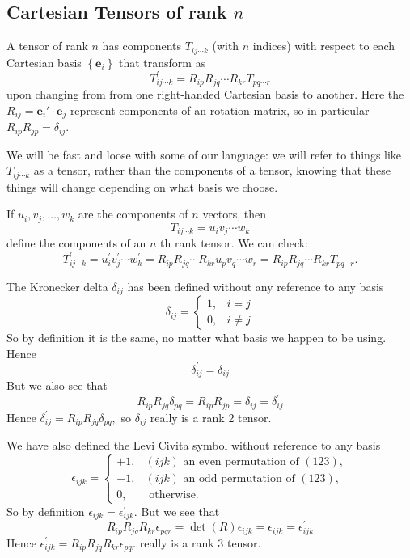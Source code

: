 \subsection{Cartesian Tensors of rank $ n $}
\begin{definition}
    A tensor of rank $n$ has components $T_{i j \cdots k}$ (with $n$ indices) with respect to each Cartesian basis $\left\{\mathbf{e}_{i}\right\}$ that transform as
    \[
        T_{i j \cdots k}^{\prime}=R_{i p} R_{j q} \cdots R_{k r} T_{p q \cdots r}
    \]
    upon changing from from one right-handed Cartesian basis to another. Here the $R_{i j}=\mathbf{e}_i' \cdot \mathbf{e}_j$ represent components of an rotation matrix, so in particular $R_{i p} R_{j p}=\delta_{i j}$.
\end{definition}

We will be fast and loose with some of our language: we will refer to things like $T_{i j \cdots k}$ as a tensor, rather than the components of a tensor, knowing that these things will change depending on what basis we choose.
\begin{example}
    If $u_{i}, v_{j}, \dots, w_{k}$ are the components of $n$ vectors, then
    \[
    T_{i j \cdots k}=u_{i} v_{j} \cdots w_{k}
    \]
    define the components of an $n$ th rank tensor. We can check:
    \[
    T_{i j \cdots k}^{\prime}=u_{i}^{\prime} v_{j}^{\prime} \cdots w_{k}^{\prime}=R_{i p} R_{j q} \cdots R_{k r} u_{p} v_{q} \cdots w_{r}=R_{i p} R_{j q} \cdots R_{k r} T_{p q \cdots r}.
    \]
\end{example}
\begin{example}
    The Kronecker delta $\delta_{i j}$ has been defined without any reference to any basis
    \[
    \delta_{i j}=\begin{cases}
        1, & i=j \\
        0, & i \neq j
    \end{cases} 
    \]
    So by definition it is the same, no matter what basis we happen to be using. Hence
    \[
    \delta_{i j}^{\prime}=\delta_{i j}
    \]
    But we also see that
    \[
    R_{i p} R_{j q} \delta_{p q}=R_{i p} R_{j p}=\delta_{i j}=\delta_{i j}^{\prime}
    \]
    Hence $\delta_{i j}^{\prime}=R_{i p} R_{j q} \delta_{p q},$ so $\delta_{i j}$ really is a rank 2 tensor.
\end{example}
\begin{example}
    We have also defined the Levi Civita symbol without reference to any basis
    \[
    \epsilon_{i j k}=\begin{cases}
        +1, & (i j k) \text { an even permutation of }(123), \\
        -1, & (i j k) \text { an odd permutation of }(123), \\
        0, & \text { otherwise. }
    \end{cases} 
    \]
    So by definition $\epsilon_{i j k}=\epsilon_{i j k}^{\prime} .$ But we see that
    \[
    R_{i p} R_{j q} R_{k r} \epsilon_{p q r}=\operatorname{det}(R) \epsilon_{i j k}=\epsilon_{i j k}=\epsilon_{i j k}^{\prime}
    \]
    Hence $\epsilon_{i j k}^{\prime}=R_{i p} R_{j q} R_{k r} \epsilon_{p q r}$ really is a rank 3 tensor.
\end{example}
